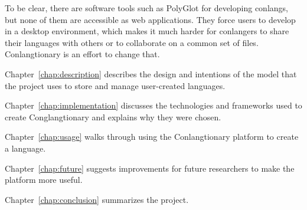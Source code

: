 To be clear, there are software tools such as PolyGlot for developing conlangs, but none of them are accessible as web applications. They force users to develop in a desktop environment, which makes it much harder for conlangers to share their languages with others or to collaborate on a common set of files. Conlangtionary is an effort to change that.

Chapter~\ref{chap:description} describes the design and intentions of the model that the project uses to store and manage user-created languages.

Chapter~\ref{chap:implementation} discusses the technologies and frameworks used to create Conglangtionary and explains why they were chosen.

Chapter~\ref{chap:usage} walks through using the Conlangtionary platform to create a language.

Chapter~\ref{chap:future} suggests improvements for future researchers to make the platform more useful.

Chapter~\ref{chap:conclusion} summarizes the project.